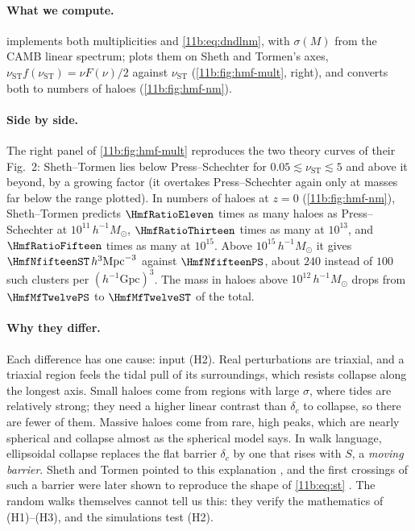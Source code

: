 \paragraph{What we compute.}
 implements both multiplicities and \eqref{11b:eq:dndlnm}, with
$\sigma(M)$ from the CAMB linear spectrum;  plots them
on Sheth and Tormen's axes, $\nu_{\mathrm{ST}}f(\nu_{\mathrm{ST}})=\nu F(\nu)/2$
against $\nu_{\mathrm{ST}}$ (\cref{11b:fig:hmf-mult}, right), and converts both to
numbers of haloes (\cref{11b:fig:hmf-nm}).

\paragraph{Side by side.}
The right panel of \cref{11b:fig:hmf-mult} reproduces the two theory curves of
their Fig.~2: Sheth--Tormen lies below Press--Schechter for
$0.05\lesssim\nu_{\mathrm{ST}}\lesssim5$ and above it beyond, by a growing
factor (it overtakes Press--Schechter again only at masses far below the range
plotted). In numbers
of haloes at $z=0$ (\cref{11b:fig:hmf-nm}), Sheth--Tormen predicts
$\HmfRatioEleven$ times as many haloes as Press--Schechter at
$10^{11}\,h^{-1}M_\odot$, $\HmfRatioThirteen$ times as many at $10^{13}$, and
$\HmfRatioFifteen$ times as many at $10^{15}$. Above $10^{15}\,h^{-1}M_\odot$ it
gives $\HmfNfifteenST\,h^3\mathrm{Mpc}^{-3}$ against $\HmfNfifteenPS$, about
$240$ instead of $100$ such clusters per $(h^{-1}\mathrm{Gpc})^3$. The mass in
haloes above $10^{12}\,h^{-1}M_\odot$ drops from $\HmfMfTwelvePS$ to
$\HmfMfTwelveST$ of the total.

\paragraph{Why they differ.}
Each difference has one cause: input (H2). Real perturbations are triaxial, and a
triaxial region feels the tidal pull of its surroundings, which resists collapse
along the longest axis. Small haloes come from regions with large $\sigma$, where
tides are relatively strong; they need a higher linear contrast than $\delta_c$
to collapse, so there are fewer of them. Massive haloes come from rare, high
peaks, which are nearly spherical and collapse almost as the spherical model
says. In walk language, ellipsoidal collapse replaces the flat barrier $\delta_c$
by one that rises with $S$, a \emph{moving barrier}. Sheth and Tormen pointed to
this explanation , and the first crossings of such a
barrier were later shown to reproduce the shape of \eqref{11b:eq:st}
\cite{ShethMoTormen2001}. The random walks themselves cannot tell us this:
they verify the mathematics of (H1)--(H3), and the simulations test (H2).

